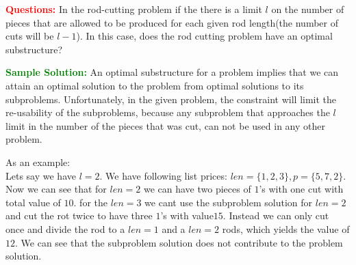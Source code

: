\problem

\textcolor{Red}{\textbf{Questions:}}
In the rod-cutting problem if the there is a limit $l$ on the number of pieces that are allowed to be produced for each given rod length(the number of cuts will be $l-1$). In this case, does the rod cutting problem have an optimal substructure?

\textcolor{Green}{\textbf{Sample Solution:}}
An optimal substructure for a problem implies that we can attain an optimal solution to the problem from optimal solutions to its subproblems. Unfortunately, in the given problem, the constraint will limit the re-usability of the subproblems, because any subproblem that approaches the $l$ limit in the number of the pieces that was cut, can not be used in any other problem.

As an example:\\
Lets say we have $l = 2$. We have following list prices: $len = \{1,2,3\}, p =\{5,7,2\}$. Now we can see that for $len = 2$ we can have two pieces of $1$'s with one cut with total value of $10$. for the $len=3$ we cant use the subproblem solution for $len=2$ and cut the rot twice to have three $1$'s with value$15$. Instead we can only cut once and divide the rod to a $len=1$ and a $len=2$ rods, which yields the value of $12$. We can see that the subproblem solution does not contribute to the problem solution.


